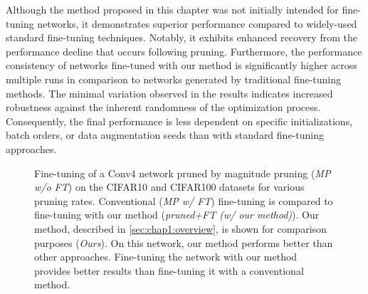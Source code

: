 Although the method proposed in this chapter was not initially intended for
fine-tuning networks, it demonstrates superior performance compared to
widely-used standard fine-tuning techniques. Notably, it exhibits enhanced
recovery from the performance decline that occurs following pruning.
Furthermore, the performance consistency of networks fine-tuned with our method
is significantly higher across multiple runs in comparison to networks generated
by traditional fine-tuning methods. The minimal variation observed in the
results indicates increased robustness against the inherent randomness of the
optimization process. Consequently, the final performance is less dependent on
specific initializations, batch orders, or data augmentation seeds than with
standard fine-tuning approaches.\\


\begin{figure}
\centering
{}
  \caption{ Fine-tuning of a Conv4 network pruned by magnitude pruning (\emph{MP
  w/o FT}) on the CIFAR10 and CIFAR100 datasets for various pruning rates.
  Conventional (\emph{MP w/ FT}) fine-tuning is compared to fine-tuning with our
  method (\emph{pruned+FT (w/ our method)}). Our method, described in
  \cref{sec:chap1:overview}, is shown for comparison purposes (\emph{Ours}). On
  this network, our method performs better than other approaches. Fine-tuning
  the network with our method provides better results than fine-tuning it with a
  conventional method.}
    \label{fig:chap1:finetuning_impact_conv4}
\end{figure}


